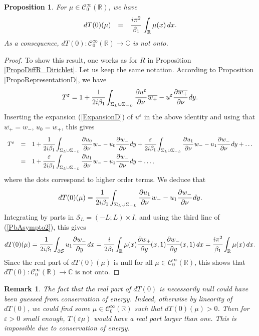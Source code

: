 \documentclass[11pt,a4paper]{report}
\newcommand{\dsp}{\displaystyle}
\newcommand{\eps}{\varepsilon}
\newcommand{\Cplx}{\mathbb{C}}
\newcommand{\R}{\mathbb{R}}
\newtheorem{remark}[theorem]{Remark}
\newtheorem{proposition}[theorem]{Proposition}
\begin{document}
\begin{proposition}\label{PropoDiffT_Dirichlet}
For $\mu\in\mathscr{C}^\infty_0(\R)$, we have
\[
\begin{array}{rcl}
dT(0)(\mu)&=&\dsp\cfrac{i \pi^2}{\beta_1}\,\int_{\R}\mu(x)\,dx.
\end{array}
\]
As a consequence, $dT(0):\mathscr{C}^\infty_0(\R)\to\Cplx$ is not onto.
\end{proposition}
\begin{proof}
To show this result, one works as for $R$ in Proposition \ref{PropoDiffR_Dirichlet}. Let us keep the same notation. 
According to Proposition \ref{PropoRepresentationD}, we have 
\[
T^\eps=1+\cfrac{1}{2i\beta_1}\dsp\int_{\Sigma_{L}\cup \Sigma_{-L}}\cfrac{\partial u^\eps}{\partial \nu}\,\overline{w_+}-u^\eps\cfrac{\partial \overline{w_+}}{\partial \nu}\,dy.
\]
Inserting the expansion (\ref{ExpansionD}) of $u^\eps$ in the above identity and using that $\overline{w_+}=w_-$, $u_0=w_+$, this gives
\[
\begin{array}{rcl}
T^\eps&=&1+\dsp\cfrac{1}{2i\beta_1}\dsp\int_{\Sigma_{L}\cup \Sigma_{-L}}\cfrac{\partial u_0}{\partial \nu}\,w_--u_0\cfrac{\partial w_-}{\partial \nu}\,dy+\cfrac{\eps}{2i\beta_1}\dsp\int_{\Sigma_{L}\cup \Sigma_{-L}}\cfrac{\partial u_1}{\partial \nu}\,w_--u_1\cfrac{\partial w_-}{\partial \nu}\,dy+\dots \\[8pt]
&=& 1+\cfrac{\eps}{2i\beta_1}\dsp\int_{\Sigma_{L}\cup \Sigma_{-L}}\cfrac{\partial u_1}{\partial \nu}\,w_--u_1\cfrac{\partial w_-}{\partial \nu}\,dy+\dots ,
\end{array}
\]
where the dots correspond to higher order terms. We deduce that 
\[
dT(0)(\mu)=\cfrac{1}{2i\beta_1}\dsp\int_{\Sigma_{L}\cup \Sigma_{-L}}\cfrac{\partial u_1}{\partial \nu}\,w_--u_1\cfrac{\partial w_-}{\partial \nu}\,dy.
\]
Integrating by parts in $\mathcal{S}_L=(-L;L)\times I$, and using the third line of (\ref{PbAsympto2}), this gives 
\[
dT(0)(\mu)=\dsp \cfrac{1}{2i\beta_1}\dsp\int_{\partial\mathcal{S}} u_1\cfrac{\partial w_-}{\partial y}\,dx =\dsp \cfrac{i}{2\beta_1}\dsp\int_{\R} \mu(x)\cfrac{\partial w_+}{\partial y}(x,1)\cfrac{\partial w_-}{\partial y}(x,1)\,dx = \cfrac{i\pi^2}{\beta_1}\dsp\int_{\R} \mu(x)\,dx.
\]
Since the real part of $dT(0)(\mu)$ is null for all $\mu\in\mathscr{C}^\infty_0(\R)$, this shows that $dT(0):\mathscr{C}^\infty_0(\R)\to\Cplx$ is not onto.
\end{proof}
\begin{remark}
The fact that the real part of $dT(0)$ is necessarily null could have been guessed from conservation of energy. Indeed, otherwise by linearity of $dT(0)$, we could find some $\mu\in \mathscr{C}^\infty_0(\R)$ such that $dT(0)(\mu)>0$. Then for $\eps>0$ small enough, $T(\eps\mu)$ would have a real part larger than one. This is impossible due to conservation of energy.
\end{remark}
\end{document}
